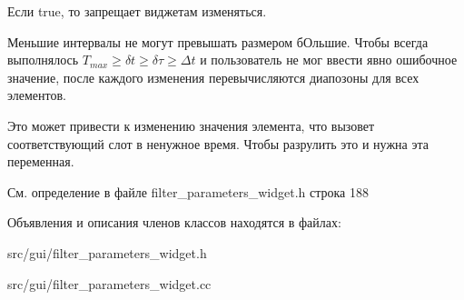 Если true, то запрещает виджетам изменяться.

Меньшие интервалы не могут превышать размером бОльшие. Чтобы всегда выполнялось $T_{max} \geq \delta t \geq \delta \tau \geq \Delta t$ и пользователь не мог ввести явно ошибочное значение, после каждого изменения перевычисляются диапозоны для всех элементов.

Это может привести к изменению значения элемента, что вызовет соответствующий слот в ненужное время. Чтобы разрулить это и нужна эта переменная. 

См. определение в файле filter\+\_\+parameters\+\_\+widget.\+h строка 188



Объявления и описания членов классов находятся в файлах\+:\begin{DoxyCompactItemize}
\item 
src/gui/filter\+\_\+parameters\+\_\+widget.\+h\item 
src/gui/filter\+\_\+parameters\+\_\+widget.\+cc\end{DoxyCompactItemize}
